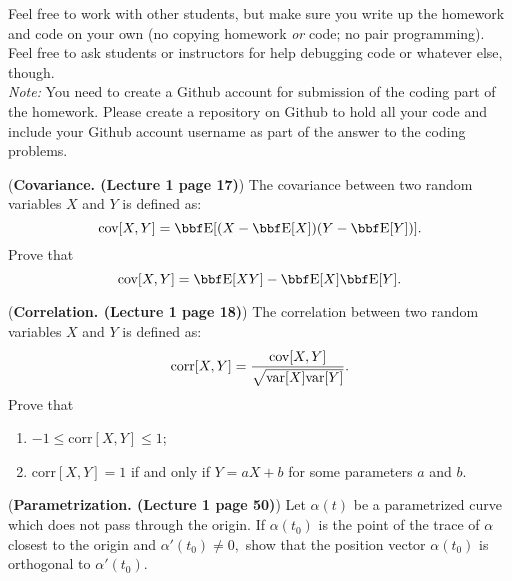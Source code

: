 \documentclass[12pt,letterpaper]{hmcpset}
\begin{document}
Feel free to work with other students, but make sure you write up the homework
and code on your own (no copying homework \textit{or} code; no pair programming).
Feel free to ask students or instructors for help debugging code or whatever else,
though.\\

\textit{Note:} You need to create a Github account for submission of the coding part of the homework. Please create a repository on Github to hold all your code and include your Github account username as part of the answer to the coding problems.

\begin{problem}[1]
(\textbf{Covariance. (Lecture 1 page 17)}) The covariance between two random variables $X$ and $Y$ is defined as:
$$
   \cov[X,Y] = \EE[(X-\EE[X])(Y-\EE[Y])].
$$
Prove that 
$$
\cov[X,Y] = \EE[XY]- \EE[X] \EE[Y].
$$
\end{problem}
\begin{solution}
    \vfill
\end{solution}
\newpage




\begin{problem}[2]
(\textbf{Correlation. (Lecture 1 page 18)}) The correlation between two random variables $X$ and $Y$ is defined as:
$$
\text{corr}[X,Y] =\frac{ {\hbox{cov}}[X,Y]}{\sqrt{{\hbox{var}}[X]{\hbox{var}}[Y]}}.
$$
Prove that 
\begin{enumerate}
\item $-1\le\text{corr}[X,Y]\le1$;
\item $\text{corr}[X,Y]=1$ if and only if $Y=aX+b$ for some parameters $a$ and $b$.
\end{enumerate}


\end{problem}
\begin{solution}
    \vfill
\end{solution}
\newpage

\begin{problem}[3]
	(\textbf{Parametrization. (Lecture 1 page 50)}) Let $\alpha(t)$ be a parametrized curve which does not pass through the origin. If $\alpha(t_0)$ is the point of the trace of $\alpha$ closest to the origin and $\alpha'(t_0)\neq0,$ show that the position vector $\alpha(t_0)$ is orthogonal to $\alpha'(t_0)$.
	
	
\end{problem}
\begin{solution}
	\vfill
\end{solution}
\newpage
\end{document}
